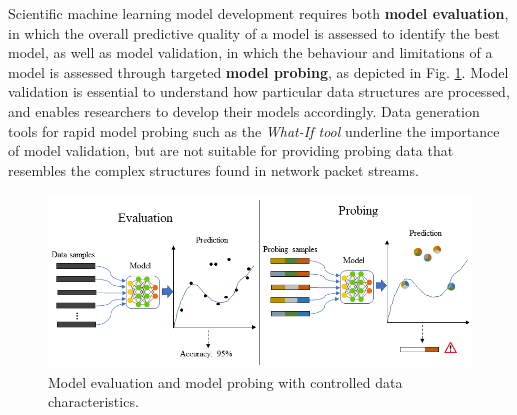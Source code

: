 \documentclass[runningheads]{llncs}
\begin{document}


Scientific machine learning model development requires both \textbf{model evaluation}, in which the overall predictive quality of a model is assessed to identify the best model, as well as model validation, in which the behaviour and limitations of a model is assessed through targeted \textbf{model probing}, as depicted in Fig. \ref{Fig:Prob}. Model validation is essential to understand how particular data structures are processed, and enables researchers to develop their models accordingly. Data generation tools for rapid model probing such as the \textit{What-If tool} \cite{wexler2019if} underline the importance of model validation, but are not suitable for providing probing data that resembles the complex structures found in network packet streams.

\begin{figure}
\centering
\includegraphics[width=\textwidth]{images/Eva_Prob.png}
\caption{Model evaluation and model probing with controlled data characteristics.}\label{Fig:Prob}
\end{figure}
\end{document}
